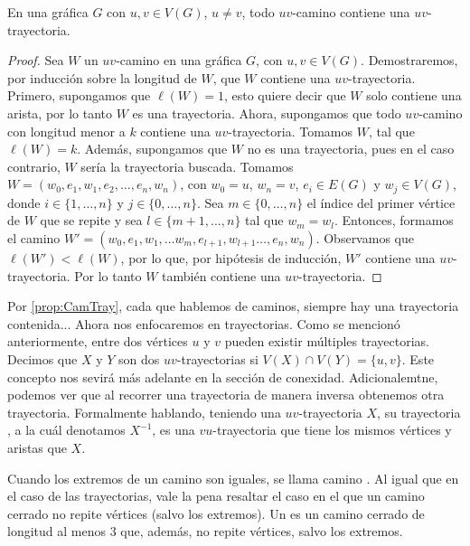 
    \begin{proposicion}
    \label{prop:CamTray}
        En una gr\'afica $G$ con $u, v \in V(G)$, $u \ne v$, todo $uv$-camino
        contiene una $uv$-trayectoria.
    \end{proposicion}


    \begin{proof}
        Sea $W$ un $uv$-camino en una gr\'afica $G$, con $u,v \in V(G)$.
        Demostraremos, por inducci\'on sobre la longitud de $W$, que $W$
        contiene una $uv$-trayectoria. Primero, supongamos que $\ell(W)=1$, esto
        quiere decir que $W$ solo contiene una arista, por lo tanto $W$ es una
        trayectoria. Ahora, supongamos que todo $uv$-camino con longitud menor a
        $k$ contiene una $uv$-trayectoria. Tomamos $W$, tal que $\ell(W) = k$.
        Adem\'as, supongamos que $W$ no es una trayectoria, pues en el caso
        contrario, $W$ ser\'ia la trayectoria buscada. Tomamos $W=
        (w_0,e_1,w_1,e_2, \dots, e_n,w_n)$, con $w_0=u$, $w_n=v$, $e_i \in E(G)$
        y $w_j \in V(G)$, donde $i \in \{1, \dots, n\}$ y $j \in \{0, \dots,
        n\}$. Sea $m \in \{0, \dots, n\}$ el \'indice del primer v\'ertice de
        $W$ que se repite y sea $l \in \{m+1, \dots, n\}$ tal que $w_m = w_l$.
        Entonces, formamos el camino $W'= (w_0,e_1,w_1,\dots w_m, e_{l+1},
        w_{l+1} \dots, e_n,w_n)$. Observamos que $\ell(W')<\ell(W)$, por lo que,
        por hip\'otesis de inducci\'on, $W'$ contiene una $uv$-trayectoria. Por
        lo tanto $W$ tambi\'en contiene una $uv$-trayectoria.
    \end{proof}
    
    Por \cref{prop:CamTray}, cada que hablemos de caminos, siempre hay una
   trayectoria contenida... Ahora nos enfocaremos en trayectorias. Como se
   mencion\'o anteriormente, entre dos v\'ertices $u$ y $v$ pueden existir
   m\'ultiples trayectorias. Decimos que $X$ y $Y$ son dos $uv$-trayectorias
    si $V(X)\cap V(Y)=\{u,v\}$.
   Este concepto nos sevir\'a m\'as adelante en la secci\'on de conexidad.
   Adicionalemtne, podemos ver que al recorrer una trayectoria de manera inversa
   obtenemos otra trayectoria. Formalmente hablando, teniendo una
   $uv$-trayectoria $X$, su trayectoria , a la
   cu\'al denotamos $X^{-1}$, es una $vu$-trayectoria que tiene los mismos
   v\'ertices y aristas que $X$.

    Cuando los extremos de un camino son iguales, se llama camino
    . Al igual que en el caso de las trayectorias,
    vale la pena resaltar el caso en el que un camino cerrado no repite
    v\'ertices (salvo los extremos). Un  es un camino cerrado de
    longitud al menos $3$ que, adem\'as, no repite v\'ertices, salvo los
    extremos. 

